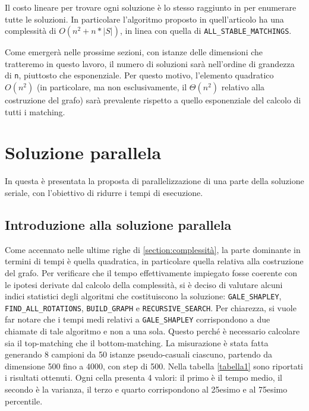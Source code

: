 \documentclass[12pt]{article}
\begin{document}
    Il costo lineare per trovare ogni soluzione è lo stesso raggiunto in \cite{Gusfield3FastAlg} per enumerare tutte le soluzioni. In particolare l'algoritmo proposto in quell'articolo ha una complessità di $O(n^2 + n*|S|)$, in linea con quella di \texttt{ALL\_STABLE\_MATCHINGS}.

    Come emergerà nelle prossime sezioni, con istanze delle dimensioni che tratteremo in questo lavoro, il numero di soluzioni sarà nell'ordine di grandezza di \texttt{n}, piuttosto che esponenziale. Per questo motivo, l'elemento quadratico $O(n^2)$ (in particolare, ma non esclusivamente, il $\Theta(n^2)$ relativo alla costruzione del grafo) sarà prevalente rispetto a quello esponenziale del calcolo di tutti i matching.

\pagebreak

\section{Soluzione parallela}
    In questa è presentata la proposta di parallelizzazione di una parte della soluzione seriale, con l'obiettivo di ridurre i tempi di esecuzione. 
    
    \subsection{Introduzione alla soluzione parallela}
        Come accennato nelle ultime righe di \ref{section:complessità}, la parte dominante in termini di tempi è quella quadratica, in particolare quella relativa alla costruzione del grafo. Per verificare che il tempo effettivamente impiegato fosse coerente con le ipotesi derivate dal calcolo della complessità, si è deciso di valutare alcuni indici statistici degli algoritmi che costituiscono la soluzione: \texttt{GALE\_SHAPLEY}, \texttt{FIND\_ALL\_ROTATIONS}, \texttt{BUILD\_GRAPH} e \texttt{RECURSIVE\_SEARCH}. Per chiarezza, si vuole far notare che i tempi medi relativi a \texttt{GALE\_SHAPLEY} corrispondono a due chiamate di tale algoritmo e non a una sola. Questo perché è necessario calcolare sia il top-matching che il bottom-matching. La misurazione è stata fatta generando 8 campioni da 50 istanze pseudo-casuali ciascuno, partendo da dimensione 500 fino a 4000, con step di 500. Nella tabella \ref{tabella1} sono riportati i risultati ottenuti. Ogni cella presenta 4 valori: il primo è il tempo medio, il secondo è la varianza, il terzo e quarto corrispondono al 25esimo e al 75esimo percentile.
\end{document}
